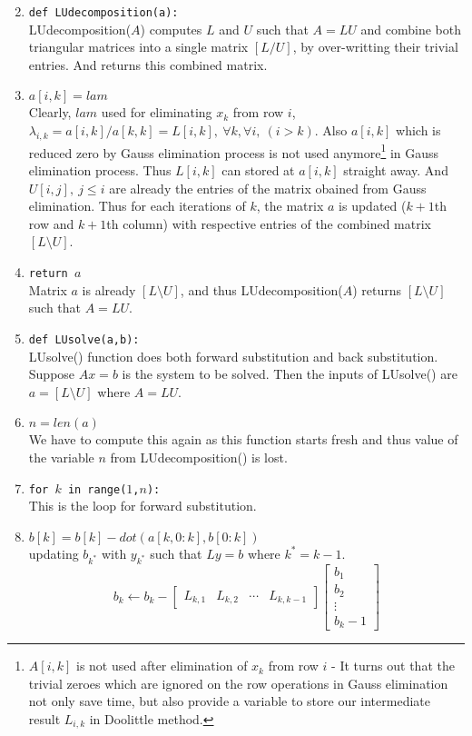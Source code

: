 \begin{commentary}
\begin{enumerate}[label=Line \arabic*]
	\setcounter{enumi}{1}
	\item \texttt{def LUdecomposition(a):} \\ LUdecomposition($A$) computes $L$ and $U$ such that $A = LU$ and combine both triangular matrices into a single matrix $[L/U]$, by over-writting their trivial entries. And returns this combined matrix.
	\setcounter{enumi}{8}
	\item \texttt{$a[i,k]=lam$} \\ Clearly, $lam$ used for eliminating $x_k$ from row $i$, $\lambda_{i,k} = a[i,k]/a[k,k] = L[i,k],\ \forall k, \forall i,\ (i>k)$. Also $a[i,k]$ which is reduced zero by Gauss elimination process is not used anymore\footnote{$A[i,k]$ is not used after elimination of $x_k$ from row $i$ - It turns out that the trivial zeroes which are ignored on the row operations in Gauss elimination not only save time, but also provide a variable to store our intermediate result $L_{i,k}$ in Doolittle method.} in Gauss elimination process. Thus $L[i,k]$ can stored at $a[i,k]$ straight away. And $U[i,j],\ j\le i$ are already the entries of the matrix obained from Gauss elimination. Thus for each iterations of $k$, the matrix $a$ is updated ($k+1$th row and $k+1$th column) with respective entries of the combined matrix $[L\text{\textbackslash{}}U]$.
	\item \texttt{return $a$} \\ Matrix $a$ is already $[L\text{\textbackslash{}}U]$, and thus LUdecomposition($A$) returns $[L\text{\textbackslash{}}U]$ such that $A = LU$.
	\item \texttt{def LUsolve(a,b):} \\ LUsolve() function does both forward substitution and back substitution. Suppose $Ax = b$ is the system to be solved. Then the inputs of LUsolve() are $ a = [L\text{\textbackslash{}}U]$ where $A = LU$. 
	\item \texttt{$n = len(a)$} \\ We have to compute this again as this function starts fresh and thus value of the variable $n$ from LUdecomposition() is lost.
	\item \texttt{for $k$ in range($1$,$n$):} \\ This is the loop for forward substitution.
	\item \texttt{$b[k] = b[k]-dot(a[k,0:k],b[0:k])$} \\ updating $b_{k^*}$ with $y_{k^*}$ such that $Ly = b$ where $k^* = k-1$.
	\[ b_k \leftarrow b_k - \begin{bmatrix} L_{k,1} & L_{k,2} & \cdots & L_{k,k-1} \end{bmatrix} \begin{bmatrix} b_1 \\ b_2 \\ \vdots \\ b_k-1 \end{bmatrix} \]

\end{enumerate}
\end{commentary}
